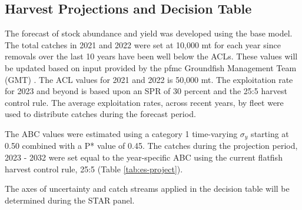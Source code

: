 \documentclass[11pt,
  english,
  a4paper,
]{article}
\begin{document}
\leavevmode\tagmcend\tagstructend\par


\hypertarget{harvest-projections-and-decision-table}{%
\subsection*{Harvest Projections and Decision Table}\label{harvest-projections-and-decision-table}}

\leavevmode\tagmcend\tagstructend


The forecast of stock abundance and yield was developed using the base model. The total catches in 2021 and 2022 were set at 10,000 mt for each year since removals over the last 10 years have been well below the ACLs. These values will be updated based on input provided by the \gls{pfmc} Groundfish Management Team (GMT) . The ACL values for 2021 and 2022 is 50,000 mt. The exploitation rate for 2023 and beyond is based upon an SPR of 30 percent and the 25:5 harvest control rule. The average exploitation rates, across recent years, by fleet were used to distribute catches during the forecast period.

\leavevmode\tagmcend\tagstructend\par


The ABC values were estimated using a category 1 time-varying {\(\sigma_y\)\leavevmode\tagmcend\tagstructend} starting at 0.50 combined with a P* value of 0.45. The catches during the projection period, 2023 - 2032 were set equal to the year-specific ABC using the current flatfish harvest control rule, 25:5 (Table \ref{tab:es-project}).

\leavevmode\tagmcend\tagstructend\par


The axes of uncertainty and catch streams applied in the decision table will be determined during the STAR panel.

\leavevmode\tagmcend\tagstructend\par

\begingroup\fontsize{10}{12}\selectfont
\end{document}
